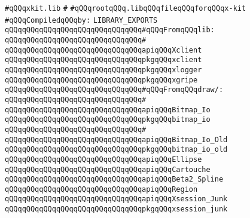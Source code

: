 \label{src/lib/x-kit/xkit.lib}
\verb|#qQQqxkit.lib|\newline
\verb|#|\newline
\verb|#qQQqrootqQQq.libqQQqfileqQQqforqQQqx-kit|\newline
\newline
\verb|#qQQqCompiledqQQqby:|\newline
\newline
\verb|LIBRARY_EXPORTS|\newline
\newline
\verb|qQQqqQQqqQQqqQQqqQQqqQQqqQQqqQQq#qQQqFromqQQqlib:|\newline
\verb|qQQqqQQqqQQqqQQqqQQqqQQqqQQqqQQq#|\newline
\verb|qQQqqQQqqQQqqQQqqQQqqQQqqQQqqQQqapiqQQqXclient|\newline
\newline
\verb|qQQqqQQqqQQqqQQqqQQqqQQqqQQqqQQqpkgqQQqxclient|\newline
\verb|qQQqqQQqqQQqqQQqqQQqqQQqqQQqqQQqpkgqQQqxlogger|\newline
\verb|qQQqqQQqqQQqqQQqqQQqqQQqqQQqqQQqpkgqQQqxgripe|\newline
\newline
\verb|qQQqqQQqqQQqqQQqqQQqqQQqqQQqqQQq#qQQqFromqQQqdraw/:|\newline
\verb|qQQqqQQqqQQqqQQqqQQqqQQqqQQqqQQq#|\newline
\verb|qQQqqQQqqQQqqQQqqQQqqQQqqQQqqQQqapiqQQqBitmap_Io|\newline
\verb|qQQqqQQqqQQqqQQqqQQqqQQqqQQqqQQqpkgqQQqbitmap_io|\newline
\verb|qQQqqQQqqQQqqQQqqQQqqQQqqQQqqQQq#|\newline
\verb|qQQqqQQqqQQqqQQqqQQqqQQqqQQqqQQqapiqQQqBitmap_Io_Old|\newline
\verb|qQQqqQQqqQQqqQQqqQQqqQQqqQQqqQQqpkgqQQqbitmap_io_old|\newline
\newline
\verb|qQQqqQQqqQQqqQQqqQQqqQQqqQQqqQQqapiqQQqEllipse|\newline
\verb|qQQqqQQqqQQqqQQqqQQqqQQqqQQqqQQqapiqQQqCartouche|\newline
\verb|qQQqqQQqqQQqqQQqqQQqqQQqqQQqqQQqapiqQQqBeta2_Spline|\newline
\verb|qQQqqQQqqQQqqQQqqQQqqQQqqQQqqQQqapiqQQqRegion|\newline
\newline
\verb|qQQqqQQqqQQqqQQqqQQqqQQqqQQqqQQqapiqQQqXsession_Junk|\newline
\verb|qQQqqQQqqQQqqQQqqQQqqQQqqQQqqQQqpkgqQQqxsession_junk|\newline
